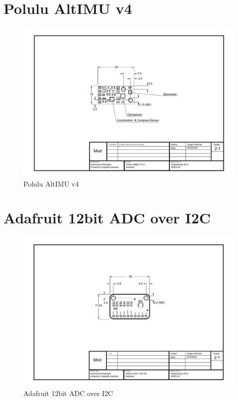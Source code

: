 \newpage
\section{Polulu AltIMU v4}
\label{sec:goals:altimu}
\begin{figure}[H]
    \centering
    \includegraphics[width=\textwidth]{fig/A4_tech_draw_topview_imu}
    \caption{Polulu AltIMU v4}
    \label{fig:parts:imu_topview}
\end{figure}

\newpage
\section{Adafruit 12bit ADC over I2C}
\label{sec:goals:adc}
\begin{figure}[H]
    \centering
    \includegraphics[width=\textwidth]{fig/A4_tech_draw_topview_adc}
    \caption{Adafruit 12bit ADC over I2C}
    \label{fig:parts:adc_topview}
\end{figure}

